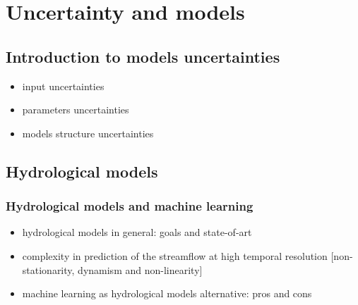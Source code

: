 \chapter{Uncertainty and models}

\ifpdf
    \graphicspath{{Chapter3/Figs/Raster/}{Chapter3/Figs/PDF/}{Chapter3/Figs/}}
\else
    \graphicspath{{Chapter3/Figs/Vector/}{Chapter3/Figs/}}
\fi

\section{Introduction to models uncertainties\label{section3.1}}


\begin{itemize}
    \item input uncertainties
    \item parameters uncertainties
    \item models structure uncertainties
\end{itemize}


\section{Hydrological models
\label{section3.2}}

\subsection{Hydrological models and machine learning}
\begin{itemize}
    \item hydrological models in general: goals and state-of-art
    \item complexity in prediction of the streamflow at high temporal resolution [non-stationarity, dynamism and non-linearity]
    \item machine learning as hydrological models alternative: pros and cons
\end{itemize}

